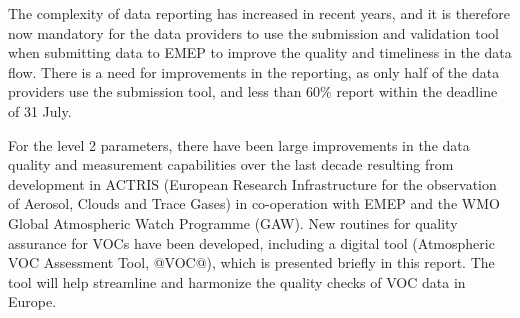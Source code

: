 The complexity of data reporting has increased in recent years, and it is therefore now mandatory for the data providers to use the submission and validation tool when submitting data to EMEP to improve the quality and timeliness in the data flow. 
There is a need for improvements in the reporting, as only half of the data 
providers use the submission tool, and less than 60\% report within the deadline of 31 July.

For the level 2 parameters, there have been large improvements in the data quality and measurement capabilities over the last decade resulting from development in ACTRIS (European Research Infrastructure for the observation of Aerosol, Clouds and Trace Gases) in co-operation with EMEP and the WMO Global Atmospheric Watch Programme (GAW). New routines for quality assurance for VOCs have been developed, including a digital tool (Atmospheric VOC Assessment Tool, @VOC@), which is presented briefly in this report. The tool will help streamline and harmonize the quality checks of VOC data in Europe.


